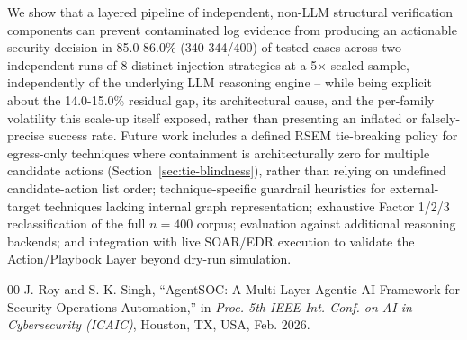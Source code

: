 \documentclass[conference]{IEEEtran}
\begin{document}
We show that a layered pipeline of independent, non-LLM structural verification components can prevent contaminated log evidence from producing an actionable security decision in 85.0-86.0\% (340-344/400) of tested cases across two independent runs of 8 distinct injection strategies at a 5$\times$-scaled sample, independently of the underlying LLM reasoning engine -- while being explicit about the 14.0-15.0\% residual gap, its architectural cause, and the per-family volatility this scale-up itself exposed, rather than presenting an inflated or falsely-precise success rate. Future work includes a defined RSEM tie-breaking policy for egress-only techniques where containment is architecturally zero for multiple candidate actions (Section~\ref{sec:tie-blindness}), rather than relying on undefined candidate-action list order; technique-specific guardrail heuristics for external-target techniques lacking internal graph representation; exhaustive Factor 1/2/3 reclassification of the full $n=400$ corpus; evaluation against additional reasoning backends; and integration with live SOAR/EDR execution to validate the Action/Playbook Layer beyond dry-run simulation.

\begin{thebibliography}{00}
 J. Roy and S. K. Singh, ``AgentSOC: A Multi-Layer Agentic AI Framework for Security Operations Automation,'' in \textit{Proc. 5th IEEE Int. Conf. on AI in Cybersecurity (ICAIC)}, Houston, TX, USA, Feb. 2026.
\end{thebibliography}
\end{document}

